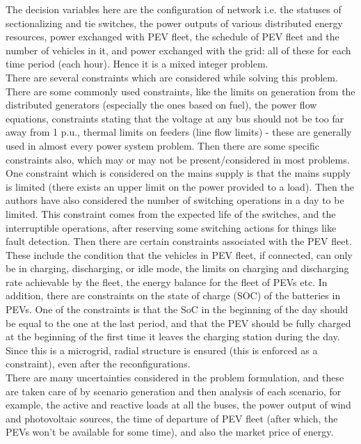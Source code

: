 The decision variables here are the configuration of network i.e. the statuses of sectionalizing and tie switches, the power outputs of various distributed energy resources, power exchanged with PEV fleet, the schedule of PEV fleet and the number of vehicles in it, and power exchanged with the grid: all of these for each time period (each hour). Hence it is a mixed integer problem.\\
There are several constraints which are considered while solving this problem. There are some commonly used constraints, like the limits on generation from the distributed generators (especially the ones based on fuel), the power flow equations, constraints stating that the voltage at any bus should not be too far away from 1 p.u., thermal limits on feeders (line flow limits) - these are generally used in almost every power system problem. Then there are some specific constraints also, which may or may not be present/considered in most problems. One constraint which is considered on the mains supply is that the mains supply is limited (there exists an upper limit on the power provided to a load). Then the authors have also considered the number of switching operations in a day to be limited. This constraint comes from the expected life of the switches, and the interruptible operations, after reserving some switching actions for things like fault detection. Then there are certain constraints associated with the PEV fleet. These include the condition that the vehicles in PEV fleet, if connected, can only be in charging, discharging, or idle mode, the limits on charging and discharging rate achievable by the fleet, the energy balance for the fleet of PEVs etc. In addition, there are constraints on the state of charge (SOC) of the batteries in PEVs. One of the constraints is that the SoC in the beginning of the day should be equal to the one at the last period, and that the PEV should be fully charged at the beginning of the first time it leaves the charging station during the day. Since this is a microgrid, radial structure is ensured (this is enforced as a constraint), even after the reconfigurations.\\
There are many uncertainties considered in the problem formulation, and these are taken care of by scenario generation and then analysis of each scenario, for example, the active and reactive loads at all the buses, the power output of wind and photovoltaic sources, the time of departure of PEV fleet (after which, the PEVs won't be available for some time), and also the market price of energy.\\
